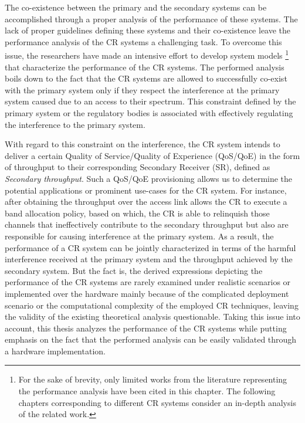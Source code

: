 The co-existence between the primary and the secondary systems can be accomplished through a proper analysis of the performance of these systems. The lack of proper guidelines defining these systems and their co-existence leave the performance analysis of the CR systems a challenging task. To overcome this issue, the researchers have made an intensive effort to develop system models \cite{Liang08, Kang209, Kang09}\footnote{For the sake of brevity, only limited works from the literature representing the performance analysis have been cited in this chapter. The following chapters corresponding to different CR systems consider an in-depth analysis of the related work.} that characterize the performance of the CR systems. The performed analysis boils down to the fact that the CR systems are allowed to successfully co-exist with the primary system only if they respect the interference at the primary system caused due to an access to their spectrum. This constraint defined by the primary system or the regulatory bodies is associated with effectively regulating the interference to the primary system. 

With regard to this constraint on the interference, the CR system intends to deliver a certain Quality of Service/Quality of Experience (QoS/QoE) in the form of throughput to their corresponding Secondary Receiver (SR), defined as \textit{Secondary throughput}. Such a QoS/QoE provisioning allows us to determine the potential applications or prominent use-cases for the CR system. For instance, after obtaining the throughput over the access link allows the CR to execute a band allocation policy, based on which, the CR is able to relinquish those channels that ineffectively contribute to the secondary throughput but also are responsible for causing interference at the primary system. As a result, the performance of a CR system can be jointly characterized in terms of the harmful interference received at the primary system and the throughput achieved by the secondary system. 
But the fact is, the derived expressions depicting the performance of the CR systems are rarely examined under realistic scenarios or implemented over the hardware mainly because of the complicated deployment scenario or the computational complexity of the employed CR techniques, leaving the validity of the existing theoretical analysis questionable. Taking this issue into account, this thesis analyzes the performance of the CR systems while putting emphasis on the fact that the performed analysis can be easily validated through a hardware implementation. 

